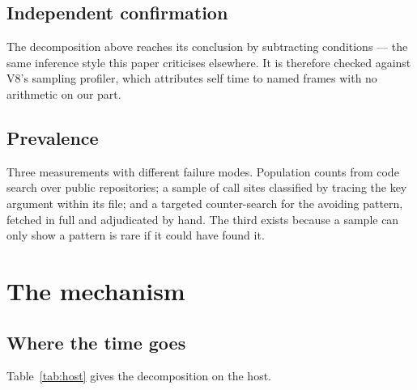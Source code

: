 \documentclass[pdflatex,sn-basic,twocolumn]{sn-jnl}
\begin{document}
\subsection{Independent confirmation}

The decomposition above reaches its conclusion by subtracting conditions --- the
same inference style this paper criticises elsewhere. It is therefore checked
against V8's sampling profiler, which attributes self time to named frames with
no arithmetic on our part.

\subsection{Prevalence}

Three measurements with different failure modes. Population counts from code
search over public repositories; a sample of call sites classified by tracing the
key argument within its file; and a targeted counter-search for the avoiding
pattern, fetched in full and adjudicated by hand. The third exists because a
sample can only show a pattern is rare if it could have found it.

\section{The mechanism}\label{sec:mechanism}

\subsection{Where the time goes}

Table~\ref{tab:host} gives the decomposition on the host.
\end{document}
